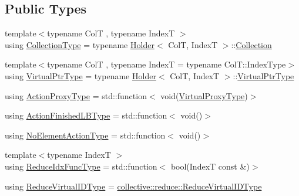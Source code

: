 \subsection*{Public Types}
\begin{DoxyCompactItemize}
\item 
{\footnotesize template$<$typename ColT , typename IndexT $>$ }\\using \hyperlink{structvt_1_1vrt_1_1collection_1_1_collection_manager_ad20a11229c9e9efe69135c207047bf85}{Collection\+Type} = typename \hyperlink{structvt_1_1vrt_1_1collection_1_1_holder}{Holder}$<$ ColT, IndexT $>$\+::\hyperlink{structvt_1_1vrt_1_1collection_1_1_collection}{Collection}
\item 
{\footnotesize template$<$typename ColT , typename IndexT  = typename Col\+T\+::\+Index\+Type$>$ }\\using \hyperlink{structvt_1_1vrt_1_1collection_1_1_collection_manager_a1da9015e52d6ecca955f57b59aab0b82}{Virtual\+Ptr\+Type} = typename \hyperlink{structvt_1_1vrt_1_1collection_1_1_holder}{Holder}$<$ ColT, IndexT $>$\+::\hyperlink{structvt_1_1vrt_1_1collection_1_1_collection_manager_a1da9015e52d6ecca955f57b59aab0b82}{Virtual\+Ptr\+Type}
\item 
using \hyperlink{structvt_1_1vrt_1_1collection_1_1_collection_manager_a98a759caf144277dcd341cdbd5538f59}{Action\+Proxy\+Type} = std\+::function$<$ void(\hyperlink{namespacevt_a1b417dd5d684f045bb58a0ede70045ac}{Virtual\+Proxy\+Type})$>$
\item 
using \hyperlink{structvt_1_1vrt_1_1collection_1_1_collection_manager_a2649daab7b437e1e2bdb5f2eefff29b6}{Action\+Finished\+L\+B\+Type} = std\+::function$<$ void()$>$
\item 
using \hyperlink{structvt_1_1vrt_1_1collection_1_1_collection_manager_a6b9b76aadc721cec45d3e0e02d849ff1}{No\+Element\+Action\+Type} = std\+::function$<$ void()$>$
\item 
{\footnotesize template$<$typename IndexT $>$ }\\using \hyperlink{structvt_1_1vrt_1_1collection_1_1_collection_manager_a47a3227ae0195c15187e8dc8762f66c4}{Reduce\+Idx\+Func\+Type} = std\+::function$<$ bool(IndexT const  \&)$>$
\item 
using \hyperlink{structvt_1_1vrt_1_1collection_1_1_collection_manager_ae820c8c22ae8c7350fa0232e0749b097}{Reduce\+Virtual\+I\+D\+Type} = \hyperlink{namespacevt_1_1collective_1_1reduce_a6d4ad09f8584c3ec79f46944eb773376}{collective\+::reduce\+::\+Reduce\+Virtual\+I\+D\+Type}
\item 

\end{DoxyCompactItemize}
